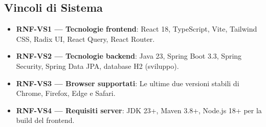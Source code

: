 \subsection{Vincoli di Sistema}

\begin{itemize}
    \item \textbf{RNF-VS1 --- Tecnologie frontend}: React 18, TypeScript, Vite, Tailwind CSS, Radix UI, React Query, React Router.
    \item \textbf{RNF-VS2 --- Tecnologie backend}: Java 23, Spring Boot 3.3, Spring Security, Spring Data JPA, database H2 (sviluppo).
    \item \textbf{RNF-VS3 --- Browser supportati}: Le ultime due versioni stabili di Chrome, Firefox, Edge e Safari.
    \item \textbf{RNF-VS4 --- Requisiti server}: JDK 23+, Maven 3.8+, Node.js 18+ per la build del frontend.
\end{itemize}

